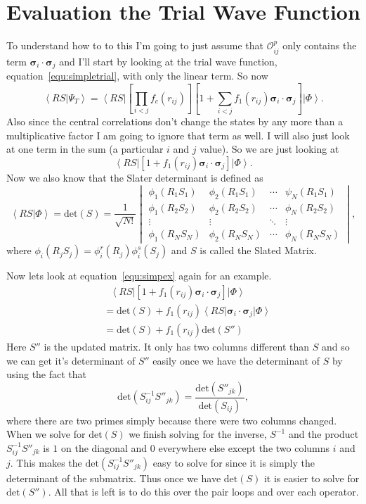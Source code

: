 \documentclass[12pt]{extarticle}
\newcommand{\Oijp}{\mathcal{O}^p_{ij}}
\newcommand{\ket}[1]{\left| #1 \right>}
\newcommand{\bra}[1]{\left< #1 \right|}
\newcommand{\braket}[2]{\left< #1 | #2 \right>}
\newcommand{\sigmai}{\bm{\sigma}_i}
\newcommand{\sigmaj}{\bm{\sigma}_j}
\newcommand{\sigmaij}{\sigmai \cdot \sigmaj}
\begin{document}
\section{Evaluation the Trial Wave Function}
To understand how to to this I'm going to just assume that $\Oijp$ only contains the term $\sigmaij$ and I'll start by looking at the trial wave function, equation~\ref{equ:simpletrial}, with only the linear term. So now
\begin{equation}
  \braket{RS}{\Psi_T} = \bra{RS} \left[ \prod_{i<j}f_c(r_{ij}) \right] \left[ 1+\sum_{i<j} f_1(r_{ij})\sigmaij \right] \ket{\Phi}.
\end{equation}
Also since the central correlations don't change the states by any more than a multiplicative factor I am going to ignore that term as well. I will also just look at one term in the sum (a particular $i$ and $j$ value). So we are just looking at
\begin{equation}
  \bra{RS} \left[ 1+f_1(r_{ij})\sigmaij \right] \ket{\Phi}.
  \label{equ:simpex}
\end{equation}
Now we also know that the Slater determinant is defined as
\begin{equation}
  \braket{RS}{\Phi} = \mathrm{det}(S) = \frac{1}{\sqrt{N!}} \begin{vmatrix}
  \phi_1(R_1S_1) & \phi_2(R_1S_1) & \cdots & \psi_N(R_1S_1) \\ 
  \phi_1(R_2S_2) & \phi_2(R_2S_2) & \cdots & \phi_N(R_2S_2) \\
  \vdots & \vdots & \ddots &\vdots \\
  \phi_1(R_NS_N)& \phi_2(R_NS_N) & \cdots & \phi_N(R_NS_N) \end{vmatrix},
\end{equation}
where $\phi_i(R_jS_j)=\phi^r_i(R_j)\phi^s_i(S_j)$ and $S$ is called the Slated Matrix.

Now lets look at equation~\ref{equ:simpex} again for an example.
\begin{align}
  & ~ ~ ~ \bra{RS} \left[ 1+f_1(r_{ij})\sigmaij \right] \ket{\Phi} \\
  &= \mathrm{det}(S) + f_1(r_{ij}) \bra{RS}\sigmaij\ket{\Phi} \\
  &= \mathrm{det}(S) + f_1(r_{ij})\mathrm{det}(S'')
\end{align}
Here $S''$ is the updated matrix. It only has two columns different than $S$ and so we can get it's determinant of $S''$ easily once we have the determinant of $S$ by using the fact that
\begin{equation}
  \mathrm{det}(S^{-1}_{ij} S''_{jk}) = \frac{\mathrm{det}(S''_{jk})}{\mathrm{det}(S_{ij})},
\end{equation}
where there are two primes simply because there were two columns changed. When we solve for $\mathrm{det}(S)$ we finish solving for the inverse, $S^{-1}$ and the product $S^{-1}_{ij}S''_{jk}$ is $1$ on the diagonal and $0$ everywhere else except the two columns $i$ and $j$. This makes the $\mathrm{det}(S^{-1}_{ij}S''_{jk})$ easy to solve for since it is simply the determinant of the submatrix. Thus once we have $\mathrm{det}(S)$ it is easier to solve for $\mathrm{det}(S'')$. All that is left is to do this over the pair loops and over each operator.
\end{document}
